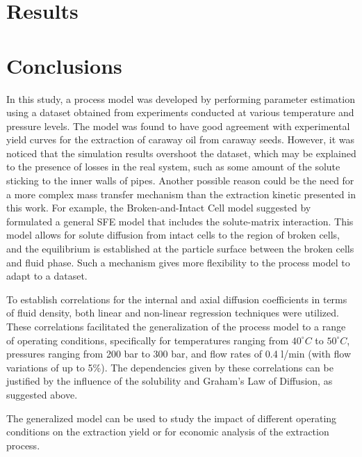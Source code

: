 \documentclass[a4paper,fleqn]{cas-dc}
\begin{document}
\section{Results}


\section{Conclusions} \label{CH: Conclusion}
In this study, a process model was developed by performing parameter estimation using a dataset obtained from experiments conducted at various temperature and pressure levels. The model was found to have good agreement with experimental yield curves for the extraction of caraway oil from caraway seeds. However, it was noticed that the simulation results overshoot the dataset, which may be explained to the presence of losses in the real system, such as some amount of the solute sticking to the inner walls of pipes. Another possible reason could be the need for a more complex mass transfer mechanism than the extraction kinetic presented in this work. For example, the Broken-and-Intact Cell model suggested by \citet{Sovova2017} formulated a general SFE model that includes the solute-matrix interaction. This model allows for solute diffusion from intact cells to the region of broken cells, and the equilibrium is established at the particle surface between the broken cells and fluid phase. Such a mechanism gives more flexibility to the process model to adapt to a dataset.

To establish correlations for the internal and axial diffusion coefficients in terms of fluid density, both linear and non-linear regression techniques were utilized. These correlations facilitated the generalization of the process model to a range of operating conditions, specifically for temperatures ranging from $40^\circ C$ to $50^\circ C$, pressures ranging from 200 bar to 300 bar, and flow rates of 0.4 l/min (with flow variations of up to 5\%). The dependencies given by these correlations can be justified by the influence of the solubility and Graham's Law of Diffusion, as suggested above.

The generalized model can be used to study the impact of different operating conditions on the extraction yield or for economic analysis of the extraction process.

\clearpage
%


\end{document}
